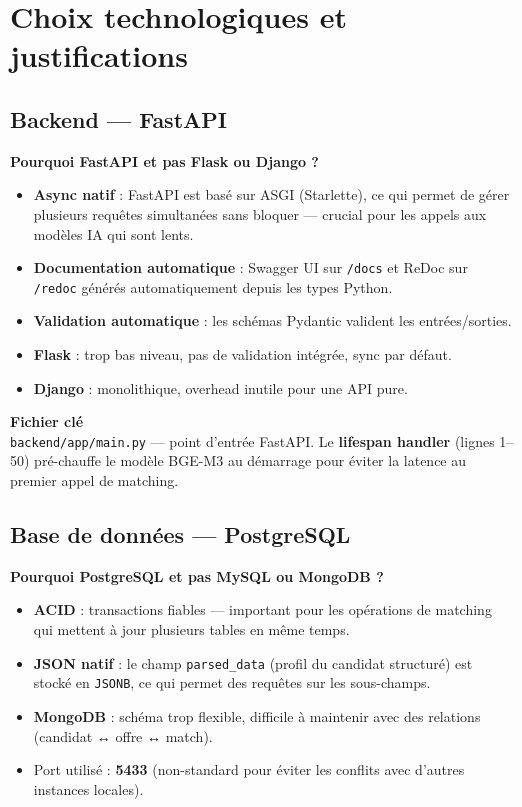 \documentclass[12pt,a4paper]{report}
\newenvironment{infobox}[1][]{%
  \begin{framed}\noindent\textbf{\textcolor{navyblue}{#1}}\\[2pt]%
}{\end{framed}}
\newenvironment{whybox}[1][Pourquoi ce choix ?]{%
  \colorbox{yellow!20}{\textbf{\textcolor{navyblue}{#1}}}\vspace{2pt}
  \begin{framed}%
}{\end{framed}}
\newcommand{\filepath}[1]{\texttt{\small\textcolor{codeblue}{#1}}}
\begin{document}
\chapter{Choix technologiques et justifications}

\section{Backend — FastAPI}

\begin{whybox}[Pourquoi FastAPI et pas Flask ou Django ?]
\begin{itemize}
  \item \textbf{Async natif} : FastAPI est basé sur ASGI (Starlette), ce qui permet
        de gérer plusieurs requêtes simultanées sans bloquer — crucial pour les
        appels aux modèles IA qui sont lents.
  \item \textbf{Documentation automatique} : Swagger UI sur \texttt{/docs} et
        ReDoc sur \texttt{/redoc} générés automatiquement depuis les types Python.
  \item \textbf{Validation automatique} : les schémas Pydantic valident les entrées/sorties.
  \item \textbf{Flask} : trop bas niveau, pas de validation intégrée, sync par défaut.
  \item \textbf{Django} : monolithique, overhead inutile pour une API pure.
\end{itemize}
\end{whybox}

\begin{infobox}[Fichier clé]
  \filepath{backend/app/main.py} — point d'entrée FastAPI.
  Le \textbf{lifespan handler} (lignes 1–50) pré-chauffe le modèle BGE-M3 au démarrage
  pour éviter la latence au premier appel de matching.
\end{infobox}

\section{Base de données — PostgreSQL}

\begin{whybox}[Pourquoi PostgreSQL et pas MySQL ou MongoDB ?]
\begin{itemize}
  \item \textbf{ACID} : transactions fiables — important pour les opérations de matching
        qui mettent à jour plusieurs tables en même temps.
  \item \textbf{JSON natif} : le champ \texttt{parsed\_data} (profil du candidat structuré)
        est stocké en \texttt{JSONB}, ce qui permet des requêtes sur les sous-champs.
  \item \textbf{MongoDB} : schéma trop flexible, difficile à maintenir avec des relations
        (candidat ↔ offre ↔ match).
  \item Port utilisé : \textbf{5433} (non-standard pour éviter les conflits avec
        d'autres instances locales).
\end{itemize}
\end{whybox}
\end{document}
